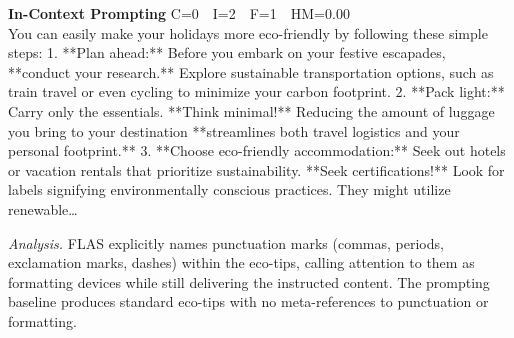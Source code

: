 \documentclass{article}
\begin{document}
\begin{casebox}
\begin{promptbox}
\textbf{In-Context Prompting} \hfill C=0~~I=2~~F=1~~HM=0.00\\[2pt]
You can easily make your holidays more eco-friendly by following these simple steps: 1. **Plan ahead:**  Before you embark on your festive escapades, **conduct your research.** Explore sustainable transportation options, such as train travel or even cycling to minimize your carbon footprint.   2. **Pack light:**  Carry only the essentials. **Think minimal!** Reducing the amount of luggage you bring to your destination **streamlines both travel logistics and your personal footprint.** 3. **Choose eco-friendly accommodation:**  Seek out hotels or vacation rentals that prioritize sustainability. **Seek certifications!** Look for labels signifying environmentally conscious practices. They might utilize renewable\ldots
\end{promptbox}

\smallskip\noindent\textit{Analysis.}
FLAS explicitly names punctuation marks (commas, periods, exclamation marks, dashes) within the eco-tips, calling attention to them as formatting devices while still delivering the instructed content. The prompting baseline produces standard eco-tips with no meta-references to punctuation or formatting.
\end{casebox}
\end{document}
